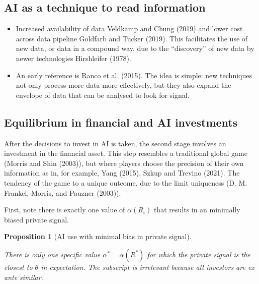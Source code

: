 \documentclass[
]{article}
\theoremstyle{plain}
\newtheorem{proposition}{Proposition}[section]
\theoremstyle{remark}
\begin{document}
\subsection{AI as a technique to read
information}\label{ai-as-a-technique-to-read-information}

\begin{itemize}
\item
  Increased availability of data Veldkamp and Chung (2019) and lower
  cost across data pipeline Goldfarb and Tucker (2019). This facilitates
  the use of new data, or data in a compound way, due to the
  ``discovery'' of new data by newer technologies Hirshleifer (1978).
\item
  An early reference is Ranco et al. (2015). The idea is simple: new
  techniques not only process more data more effectively, but they also
  expand the envelope of data that can be analysed to look for signal.
\end{itemize}

\subsection{Equilibrium in financial and AI
investments}\label{equilibrium-in-financial-and-ai-investments}

After the decisions to invest in AI is taken, the second stage involves
an investment in the financial asset. This step resembles a traditional
global game (Morris and Shin (2003)), but where players choose the
precision of their own information as in, for example, Yang (2015),
Szkup and Trevino (2021). The tendency of the game to a unique outcome,
due to the limit uniqueness (D. M. Frankel, Morris, and Pauzner (2003)).

First, note there is exactly one value of \(\alpha(R_i)\) that results
in an minimally biased private signal.

\begin{proposition}[AI use with minimal bias in private
signal]\protect\hypertarget{prp-alphainvestunbiased}{}\label{prp-alphainvestunbiased}

There is only one specific value \(\alpha^* = \alpha(R^*)\) for which
the private signal is the closest to \(\theta\) in expectation. The
subscript is irrelevant because all investors are ex ante similar.

\end{proposition}
\end{document}

